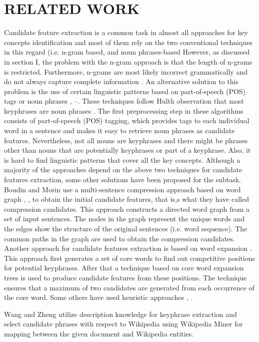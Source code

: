 \documentclass{ieeeaccess}
\begin{document}
\section{RELATED WORK}
Candidate feature extraction is a common task in almost all approaches for key concepts identification and most of them rely on the two conventional techniques in this regard (i.e. n-gram based, and noun phrases-based However, as discussed  in section I, the problem with the n-gram approach is that the length of n-grams is restricted. Furthermore, n-grams are  most likely incorrect grammatically and do not always capture complete information \cite{b1}. An alternative solution to  this problem is the use of certain linguistic patterns based on part-of-speech (POS) tags or noun phrases \cite{b1}, \cite{b10}–\cite{b16}. These techniques follow Hulth observation that most keyphrases are noun phrases \cite{b17}. The first preprocessing step in these algorithms consists of part-of-speech (POS) tagging, which provides tags to each individual  word in a sentence and makes it easy to retrieve noun phrases as candidate features. Nevertheless, not all nouns are keyphrases and there might be phrases other than nouns that are potentially keyphrases or part of a keyphrase. Also, it  is hard to find linguistic patterns that cover all the key concepts. Although a majority of the approaches depend on the  above two techniques for candidate features extraction, some other solutions have been proposed for the subtask. Boudin  and Morin \cite{b18} use a multi-sentence compression approach based on word graph \cite{b19}, \cite{b20}, to obtain the initial candidate features, that is,s what they have called compression candidates. This approach constructs a directed word graph from a set of input sentences. The nodes in the graph represent the unique words and the edges show the structure of the original sentences (i.e. word sequence). The common paths in the graph are used to obtain the   compression candidates. Another approach for candidate features extraction is based on word expansion \cite{b21}. This  approach first generates a set of core words to find out competitive positions for potential keyphrases. After that a  technique based on core word expansion trees is used to produce candidate features from these positions. The technique  ensures that a maximum of two candidates are generated from each occurrence of the core word. Some others have used  heuristic approaches \cite{b22}, \cite{b23}.
 
Wang \headeretal  \cite{b24} and Zheng \headeretal  \cite{b25} utilize description knowledge for keyphrase extraction and select candidate phrases with respect to Wikipedia using Wikipedia Miner for mapping between the given document and Wikipedia entities. 
\end{document}
